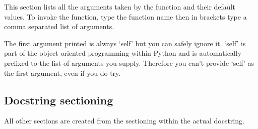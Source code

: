 This section lists all the arguments taken by the function and their default values.  To invoke the function, type the function name then in brackets type a comma separated list of arguments.

The first argument printed is always `self' but you can safely ignore it.  `self' is part of the object oriented programming within Python and is automatically prefixed to the list of arguments you supply.  Therefore you can't provide `self' as the first argument, even if you do try.


\subsection{Docstring sectioning}

All other sections are created from the sectioning within the actual docstring.




